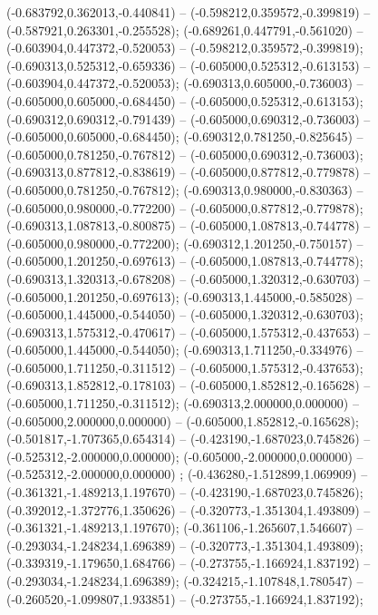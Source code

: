  (-0.683792,0.362013,-0.440841) -- (-0.598212,0.359572,-0.399819) -- (-0.587921,0.263301,-0.255528);
 (-0.689261,0.447791,-0.561020) -- (-0.603904,0.447372,-0.520053) -- (-0.598212,0.359572,-0.399819);
 (-0.690313,0.525312,-0.659336) -- (-0.605000,0.525312,-0.613153) -- (-0.603904,0.447372,-0.520053);
 (-0.690313,0.605000,-0.736003) -- (-0.605000,0.605000,-0.684450) -- (-0.605000,0.525312,-0.613153);
 (-0.690312,0.690312,-0.791439) -- (-0.605000,0.690312,-0.736003) -- (-0.605000,0.605000,-0.684450);
 (-0.690312,0.781250,-0.825645) -- (-0.605000,0.781250,-0.767812) -- (-0.605000,0.690312,-0.736003);
 (-0.690313,0.877812,-0.838619) -- (-0.605000,0.877812,-0.779878) -- (-0.605000,0.781250,-0.767812);
 (-0.690313,0.980000,-0.830363) -- (-0.605000,0.980000,-0.772200) -- (-0.605000,0.877812,-0.779878);
 (-0.690313,1.087813,-0.800875) -- (-0.605000,1.087813,-0.744778) -- (-0.605000,0.980000,-0.772200);
 (-0.690312,1.201250,-0.750157) -- (-0.605000,1.201250,-0.697613) -- (-0.605000,1.087813,-0.744778);
 (-0.690313,1.320313,-0.678208) -- (-0.605000,1.320312,-0.630703) -- (-0.605000,1.201250,-0.697613);
 (-0.690313,1.445000,-0.585028) -- (-0.605000,1.445000,-0.544050) -- (-0.605000,1.320312,-0.630703);
 (-0.690313,1.575312,-0.470617) -- (-0.605000,1.575312,-0.437653) -- (-0.605000,1.445000,-0.544050);
 (-0.690313,1.711250,-0.334976) -- (-0.605000,1.711250,-0.311512) -- (-0.605000,1.575312,-0.437653);
 (-0.690313,1.852812,-0.178103) -- (-0.605000,1.852812,-0.165628) -- (-0.605000,1.711250,-0.311512);
 (-0.690313,2.000000,0.000000) -- (-0.605000,2.000000,0.000000) -- (-0.605000,1.852812,-0.165628);
 (-0.501817,-1.707365,0.654314) -- (-0.423190,-1.687023,0.745826) -- (-0.525312,-2.000000,0.000000);
 (-0.605000,-2.000000,0.000000) -- (-0.525312,-2.000000,0.000000) ;
 (-0.436280,-1.512899,1.069909) -- (-0.361321,-1.489213,1.197670) -- (-0.423190,-1.687023,0.745826);
 (-0.392012,-1.372776,1.350626) -- (-0.320773,-1.351304,1.493809) -- (-0.361321,-1.489213,1.197670);
 (-0.361106,-1.265607,1.546607) -- (-0.293034,-1.248234,1.696389) -- (-0.320773,-1.351304,1.493809);
 (-0.339319,-1.179650,1.684766) -- (-0.273755,-1.166924,1.837192) -- (-0.293034,-1.248234,1.696389);
 (-0.324215,-1.107848,1.780547) -- (-0.260520,-1.099807,1.933851) -- (-0.273755,-1.166924,1.837192);
